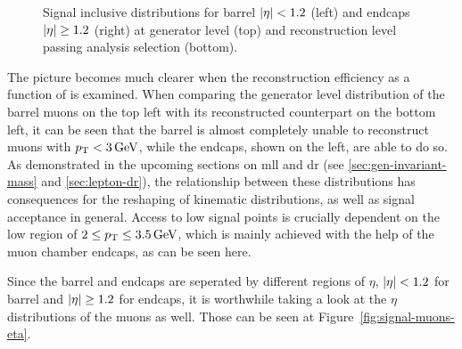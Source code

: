 \begin{figure}[!htb]
\caption[Signal \pt distributions split into barrel and endcaps]{ Signal inclusive \pt distributions for barrel $\lvert \eta \rvert < 1.2$ (left) and endcaps $\lvert \eta \rvert \geq 1.2$ (right) at generator level (top) and reconstruction level passing analysis selection (bottom).}
\label{fig:signal-pt-barrel-endcaps}
\end{figure}

The picture becomes much clearer when the reconstruction efficiency as a function of \pt is examined. When comparing the generator level distribution of the barrel muons on the top left with its reconstructed counterpart on the bottom left, it can be seen that the barrel is almost completely unable to reconstruct muons with $p_{\mathrm{T}} < 3\,\text{Ge\hspace{-.08em}V}$, while the endcaps, shown on the left, are able to do so. As demonstrated in the upcoming sections on \gls{mll} and \gls{dr} (see \ref{sec:gen-invariant-mass} and \ref{sec:lepton-dr}), the relationship between these distributions has consequences for the reshaping of kinematic distributions, as well as signal acceptance in general. Access to low \dm signal points is crucially dependent on the low \pt region of $2 \leq p_{\mathrm{T}} \leq 3.5\,\text{Ge\hspace{-.08em}V}$, which is mainly achieved with the help of the muon chamber endcaps, as can be seen here.

Since the barrel and endcaps are seperated by different regions of $\eta$, $\lvert \eta \rvert < 1.2$ for barrel and $\lvert \eta \rvert \geq 1.2$ for endcaps, it is worthwhile taking a look at the $\eta$ distributions of the muons as well. Those can be seen at Figure~\ref{fig:signal-muons-eta}.

